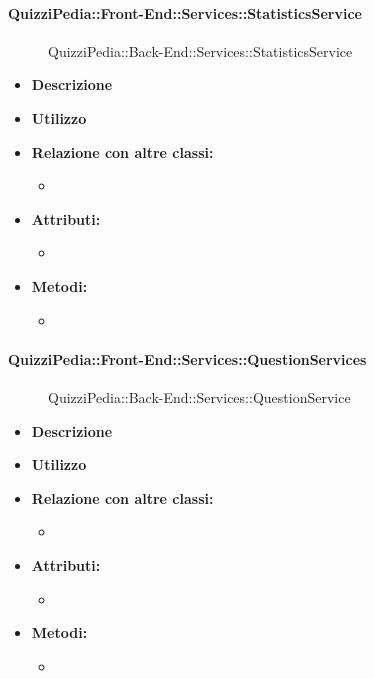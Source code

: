 \paragraph{QuizziPedia::Front-End::Services::StatisticsService}
\begin{figure}
	\centering
	\caption{QuizziPedia::Back-End::Services::StatisticsService}
\end{figure}
\begin{itemize}
	\item \textbf{Descrizione} \\ 
	\item \textbf{Utilizzo} \\
	\item \textbf{Relazione con altre classi:}
	\begin{itemize}
		\item 
	\end{itemize}
	\item \textbf{Attributi:}
	\begin{itemize}
		\item 
	\end{itemize}
	\item \textbf{Metodi:}
	\begin{itemize}
		\item 
	\end{itemize}
\end{itemize}

\paragraph{QuizziPedia::Front-End::Services::QuestionServices}
\begin{figure}
	\centering
	\caption{QuizziPedia::Back-End::Services::QuestionService}
\end{figure}
\begin{itemize}
	\item \textbf{Descrizione} \\ 
	\item \textbf{Utilizzo} \\
	\item \textbf{Relazione con altre classi:}
	\begin{itemize}
		\item 
	\end{itemize}
	\item \textbf{Attributi:}
	\begin{itemize}
		\item 
	\end{itemize}
	\item \textbf{Metodi:}
	\begin{itemize}
		\item 
	\end{itemize}
\end{itemize}


